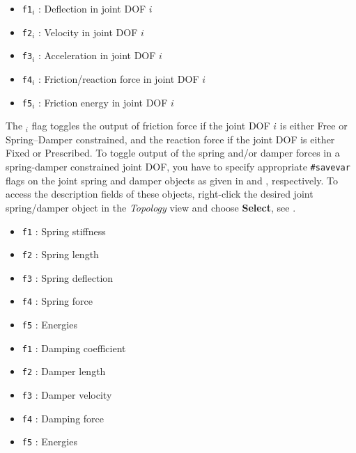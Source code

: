 \begin{itemize}
\item{\tt f1$_i$} : Deflection in joint DOF $i$
\item{\tt f2$_i$} : Velocity in joint DOF $i$
\item{\tt f3$_i$} : Acceleration in joint DOF $i$
\item{\tt f4$_i$} : Friction/reaction force in joint DOF $i$
\item{\tt f5$_i$} : Friction energy in joint DOF $i$
\end{itemize}

\noindent
The {\tt{}$_i$} flag toggles the output of friction force if the
joint DOF $i$ is either Free or Spring--Damper constrained, and the reaction
force if the joint DOF is either Fixed or Prescribed.
To toggle output of the spring and/or damper forces in a spring-damper
constrained joint DOF, you have to specify appropriate
{\tt\#savevar} flags on the joint spring and damper objects as given in
 and , respectively.
To access the description fields of these objects, right-click the desired joint
spring/damper object in the {\sl Topology} view and choose \textbf{Select},
see .




\begin{itemize}
\item{\tt f1} : Spring stiffness
\item{\tt f2} : Spring length
\item{\tt f3} : Spring deflection
\item{\tt f4} : Spring force
\item{\tt f5} : Energies
\end{itemize}

\clearpage




\begin{itemize}
\item{\tt f1} : Damping coefficient
\item{\tt f2} : Damper length
\item{\tt f3} : Damper velocity
\item{\tt f4} : Damping force
\item{\tt f5} : Energies
\end{itemize}


